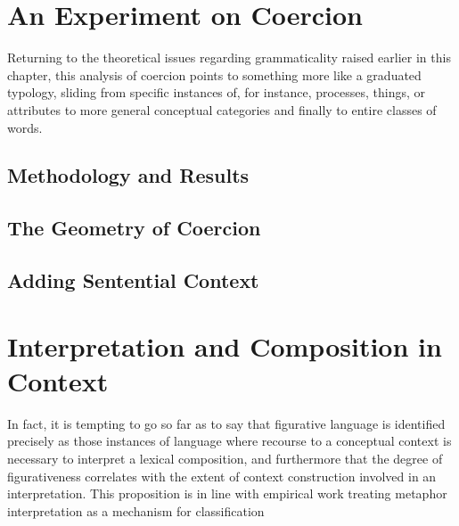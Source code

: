 \section{An Experiment on Coercion}
Returning to the theoretical issues regarding grammaticality raised earlier in this chapter, this analysis of coercion points to something more like a graduated typology, sliding from specific instances of, for instance, processes, things, or attributes to more general conceptual categories and finally to entire classes of words.

\subsection{Methodology and Results}

\subsection{The Geometry of Coercion}

\subsection{Adding Sentential Context}

\section{Interpretation and Composition in Context}

In fact, it is tempting to go so far as to say that figurative language is identified precisely as those instances of language where recourse to a conceptual context is necessary to interpret a lexical composition, and furthermore that the degree of figurativeness correlates with the extent of context construction involved in an interpretation.  This proposition is in line with  empirical work treating metaphor interpretation as a mechanism for classification

